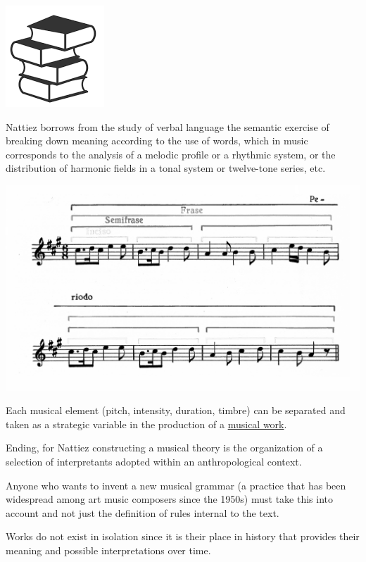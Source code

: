 \begin{center}
\includegraphics[scale=0.45]{../img/trattato.png}
\end{center}

Nattiez borrows from the study of verbal language the semantic exercise of breaking down meaning according to the use of words, which in music corresponds to the analysis of a melodic profile or a rhythmic system, or the distribution of harmonic fields in a tonal system or twelve-tone series, etc.

\begin{center}
\includegraphics[scale=0.85]{../img/frasemus.png}
\end{center}

Each musical element (pitch, intensity, duration, timbre) can be separated and taken as a strategic variable in the production of a \href{https://github.com/musicaecodice/EMC/blob/main/1_premises/suoni/quinta.mp4}{musical work}.

Ending, for Nattiez constructing a musical theory is the organization of a selection of interpretants adopted within an anthropological context.

Anyone who wants to invent a new musical grammar (a practice that has been widespread among art music composers since the 1950s) must take this into account and not just the definition of rules internal to the text.

Works do not exist in isolation since it is their place in history that provides their meaning and possible interpretations over time.


